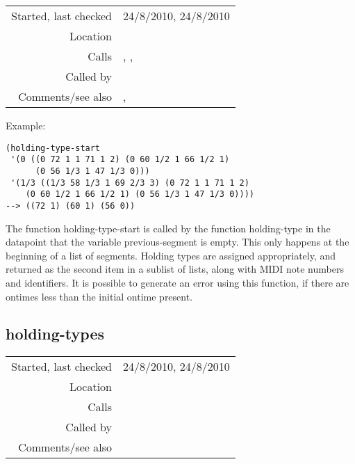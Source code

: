 \vspace{0.3cm}
\begin{tabular}{r|p{8cm}}
Started, last checked & 24/8/2010, 24/8/2010 \\
Location & \nameref{sec:spacing-states} \\
Calls & \nameref{fun:index-item-1st-occurs}, \nameref{fun:my-last},\newline \nameref{fun:nth-list-of-lists} \\
Called by & \nameref{fun:holding-type} \\
Comments/see also & \nameref{fun:holding-type-finish}, \nameref{fun:holding-type-normal}
\end{tabular}

\vspace{0.5cm}
\noindent Example:
\begin{verbatim}
(holding-type-start
 '(0 ((0 72 1 1 71 1 2) (0 60 1/2 1 66 1/2 1)
      (0 56 1/3 1 47 1/3 0)))
 '(1/3 ((1/3 58 1/3 1 69 2/3 3) (0 72 1 1 71 1 2)
	(0 60 1/2 1 66 1/2 1) (0 56 1/3 1 47 1/3 0))))
--> ((72 1) (60 1) (56 0))
\end{verbatim}

\noindent The function holding-type-start is called by
the function holding-type in the datapoint that the
variable previous-segment is empty. This only happens
at the beginning of a list of segments. Holding types
are assigned appropriately, and returned as the second
item in a sublist of lists, along with MIDI note
numbers and identifiers. It is possible to generate an
error using this function, if there are ontimes less
than the initial ontime present.


\subsection*{holding-types}\label{fun:holding-types}

\vspace{0.3cm}
\begin{tabular}{r|p{8cm}}
Started, last checked & 24/8/2010, 24/8/2010 \\
Location & \nameref{sec:spacing-states} \\
Calls & \nameref{fun:holding-type} \\
Called by & \nameref{fun:spacing-holding-states} \\
Comments/see also &
\end{tabular}


